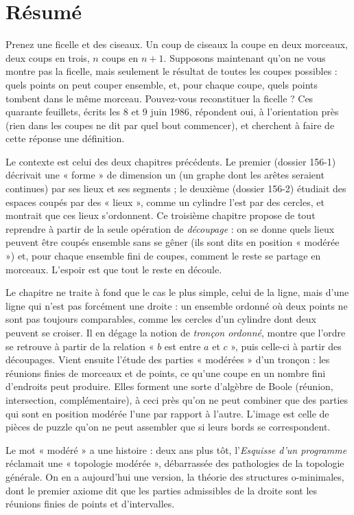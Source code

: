 \documentclass[11pt,a4paper]{article}
\begin{document}
\section*{Résumé}

\begin{resume}
Prenez une ficelle et des ciseaux. Un coup de ciseaux la coupe en deux
morceaux, deux coups en trois, $n$ coups en $n+1$. Supposons maintenant qu'on
ne vous montre pas la ficelle, mais seulement le résultat de toutes les coupes
possibles : quels points on peut couper ensemble, et, pour chaque coupe, quels
points tombent dans le même morceau. Pouvez-vous reconstituer la ficelle ? Ces
quarante feuillets, écrits les 8 et 9 juin 1986, répondent oui, à
l'orientation près (rien dans les coupes ne dit par quel bout
commencer), et cherchent à faire de cette réponse une définition.

Le contexte est celui des deux chapitres précédents. Le premier (dossier 156-1)
décrivait une « forme » de dimension un (un graphe dont les arêtes seraient
continues) par ses lieux et ses segments ; le deuxième (dossier 156-2)
étudiait des espaces coupés par des « lieux », comme un cylindre l'est par des
cercles, et montrait que ces lieux s'ordonnent. Ce troisième chapitre propose
de tout reprendre à partir de la seule opération de \emph{découpage} : on se
donne quels lieux peuvent être coupés ensemble sans se gêner (ils sont dits
en position « modérée ») et, pour chaque ensemble fini de coupes, comment le
reste se partage en morceaux. L'espoir est que tout le reste en découle.

Le chapitre ne traite à fond que le cas le plus simple, celui de la ligne, mais
d'une ligne qui n'est pas forcément une droite : un ensemble ordonné où deux
points ne sont pas toujours comparables, comme les cercles d'un cylindre dont
deux peuvent se croiser. Il en dégage la notion de \emph{tronçon ordonné},
montre que l'ordre se retrouve à partir de la relation « $b$ est entre $a$ et
$c$ », puis celle-ci à partir des découpages. Vient ensuite l'étude des parties
« modérées » d'un tronçon : les réunions finies de morceaux et de points, ce
qu'une coupe en un nombre fini d'endroits peut produire. Elles forment une sorte
d'algèbre de Boole (réunion, intersection, complémentaire), à ceci près
qu'on ne peut combiner que des parties qui sont en position modérée l'une par
rapport à l'autre. L'image est celle de pièces de puzzle qu'on ne peut
assembler que si leurs bords se correspondent.

Le mot « modéré » a une histoire : deux ans plus tôt, l'\emph{Esquisse d'un
programme} réclamait une « topologie modérée », débarrassée des pathologies de
la topologie générale. On en a aujourd'hui une version, la théorie des
structures o-minimales, dont le premier axiome dit que les parties
admissibles de la droite sont les réunions finies de points et d'intervalles.


\end{resume}
\end{document}
